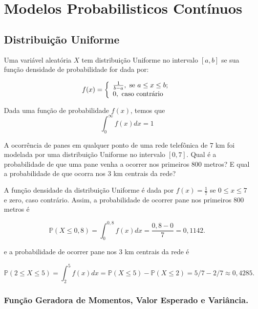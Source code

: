\documentclass[10pt,a4paper]{article}
\begin{document}
\section{Modelos Probabilisticos Contínuos}

\subsection{Distribuição Uniforme}

\begin{df}Uma variável aleatória $ X $ tem distribuição Uniforme no intervalo $ [a,b] $ se sua função densidade de probabilidade for dada por:
\end{df}

\[f(x)=\left\{\begin{array}{l} \frac{1}{b-a}, \ \hbox{se} \ a\leq x\leq b;\\ 0, \ \hbox{caso contrário}\end{array}\right.\] 	


\begin{obs}
	Dada uma função de probabilidade  $f(x)$, temos que 
	\[ \int_{0}^{\infty} f(x)dx = 1 \]
\end{obs}

\begin{eg}
	A ocorrência de panes em qualquer ponto de uma rede telefônica de $ 7 $ km foi modelada por uma distribuição Uniforme no intervalo $ [0, 7] $. Qual é a probabilidade de que uma pane venha a ocorrer nos primeiros $ 800 $ metros? E qual a probabilidade de que ocorra nos $ 3 $ km centrais da rede?
	\begin{sol}
		A função densidade da distribuição Uniforme é dada por $ f(x)=\frac{1}{7} $ se  $ 0\leq x\leq 7 $ e zero, caso contrário. Assim, a probabilidade de ocorrer pane nos primeiros 800 metros é

\[\mathbb{P}\left(X\leq 0,8\right)=\int_0^{0,8} f(x)dx=\frac{0,8-0}{7}=0,1142.\] 	

e a probabilidade de ocorrer pane nos 3 km centrais da rede é

\[\mathbb{P}\left(2\leq X\leq 5\right)=\int_2^5f(x)dx=\mathbb{P}\left(X\leq 5\right)-\mathbb{P}\left(X\leq 2\right)=5/7-2/7\approx 0,4285.\]
	\end{sol}
\end{eg}

\subsubsection{Função Geradora de Momentos, Valor Esperado e Variância.}
\end{document}
